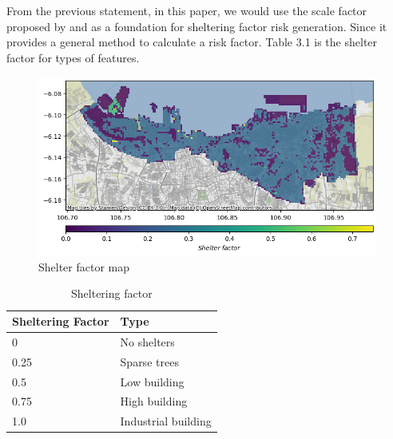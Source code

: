 \documentclass[12pt]{report}
\begin{document}
            From the previous statement, in this paper, we would use the scale factor proposed by \cite{klepeis_national_2001} and \cite{primatesta_ground_2020} as a
            foundation for sheltering factor risk generation. Since it provides a general method to calculate a risk
            factor. Table 3.1 is the shelter factor for types of features.
            
            \begin{figure}[H]
                \centering
                \includegraphics[width=\textwidth]{Plot/shelter_factor.png}
                \caption{Shelter factor map}
            \end{figure}


            \begin{table}[H]
                \centering
                \begin{tabular}{|p{4cm}|p{4cm}|}
                    Sheltering Factor & Type \\
                    \hline
                    0 & No shelters \\
                    \hline
                    0.25 & Sparse trees \\
                    \hline
                    0.5 & Low building \\
                    \hline
                    0.75 & High building \\
                    \hline
                    1.0 & Industrial building \\
                    \hline
                \end{tabular}
                \caption{Sheltering factor}
            \end{table}
\end{document}

